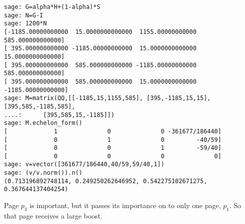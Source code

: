 \begin{exercises}
\begin{answer}
\begin{exparts}
\begin{lstlisting}
sage: G=alpha*H+(1-alpha)*S
sage: N=G-I
sage: 1200*N
[-1185.00000000000  15.0000000000000  1155.00000000000  585.000000000000]
[ 395.000000000000 -1185.00000000000  15.0000000000000  15.0000000000000]
[ 395.000000000000  585.000000000000 -1185.00000000000  585.000000000000]
[ 395.000000000000  585.000000000000  15.0000000000000 -1185.00000000000]
sage: M=matrix(QQ,[[-1185,15,1155,585], [395,-1185,15,15], [395,585,-1185,585],
....:      [395,585,15,-1185]])
sage: M.echelon_form()
[             1              0              0 -361677/186440]
[             0              1              0         -40/59]
[             0              0              1         -59/40]
[             0              0              0              0]
sage: v=vector([361677/186440,40/59,59/40,1])
sage: (v/v.norm()).n()
(0.713196892748114, 0.249250262646952, 0.542275102671275, 0.367644137404254)
\end{lstlisting}
       \item Page $p_3$ is important, but it passes its importance on to
         only one page, $p_1$.
         So that page receives a large boost.
      \end{exparts}    
    \end{answer}
\end{exercises}
\endinput


